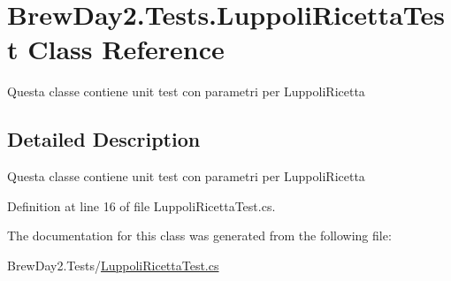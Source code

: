 \hypertarget{class_brew_day2_1_1_tests_1_1_luppoli_ricetta_test}{}\section{Brew\+Day2.\+Tests.\+Luppoli\+Ricetta\+Test Class Reference}
\label{class_brew_day2_1_1_tests_1_1_luppoli_ricetta_test}


Questa classe contiene unit test con parametri per Luppoli\+Ricetta 




\subsection{Detailed Description}
Questa classe contiene unit test con parametri per Luppoli\+Ricetta



Definition at line 16 of file Luppoli\+Ricetta\+Test.\+cs.



The documentation for this class was generated from the following file\+:\begin{DoxyCompactItemize}
\item 
Brew\+Day2.\+Tests/\mbox{\hyperlink{_luppoli_ricetta_test_8cs}{Luppoli\+Ricetta\+Test.\+cs}}\end{DoxyCompactItemize}
